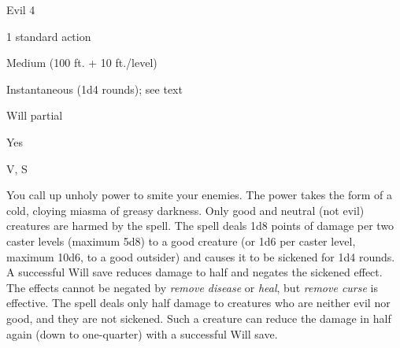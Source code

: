 
\begin{description*}
\item[Level:] Evil 4
\item[Casting Time:] 1 standard action
\item[Range:] Medium (100 ft. + 10 ft./level)
\item[Duration:] Instantaneous (1d4 rounds); see text
\item[Saving Throw:] Will partial
\item[Spell Resistance:] Yes
\item[Components:] V, S
\end{description*}

You call up unholy power to smite your enemies. The power takes the form of a cold,
cloying miasma of greasy darkness.
Only good and neutral (not evil) creatures are harmed by the spell.
The spell deals 1d8 points of damage per two caster levels (maximum 5d8) to a good
creature (or 1d6 per caster level, maximum 10d6, to a good outsider) and causes
it to be sickened for 1d4 rounds. A successful Will save reduces damage to half
and negates the sickened effect. The effects cannot be negated by \textit{remove
disease} or \textit{heal}, but \textit{remove curse} is effective.
The spell deals only half damage to creatures who are neither evil nor good, and
they are not sickened. Such a creature can reduce the damage in half again (down
to one-quarter) with a successful Will save.